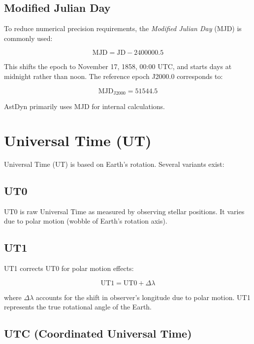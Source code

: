 \subsection{Modified Julian Day}

To reduce numerical precision requirements, the \textit{Modified Julian Day} (MJD) is commonly used:

\begin{equation}
\text{MJD} = \text{JD} - 2400000.5
\end{equation}

This shifts the epoch to November 17, 1858, 00:00 UTC, and starts days at midnight rather than noon. The reference epoch J2000.0 corresponds to:

\begin{equation}
\text{MJD}_{\text{J2000}} = 51544.5
\end{equation}

AstDyn primarily uses MJD for internal calculations.

\section{Universal Time (UT)}

Universal Time (UT) is based on Earth's rotation. Several variants exist:

\subsection{UT0}

UT0 is raw Universal Time as measured by observing stellar positions. It varies due to polar motion (wobble of Earth's rotation axis).

\subsection{UT1}

UT1 corrects UT0 for polar motion effects:

\begin{equation}
\text{UT1} = \text{UT0} + \Delta \lambda
\end{equation}

where $\Delta\lambda$ accounts for the shift in observer's longitude due to polar motion. UT1 represents the true rotational angle of the Earth.

\subsection{UTC (Coordinated Universal Time)}

